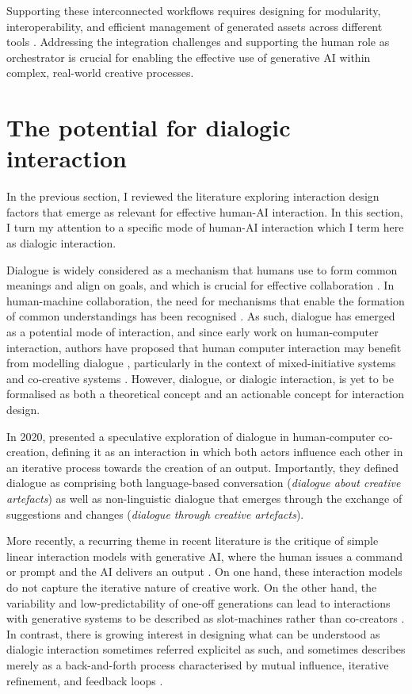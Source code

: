 Supporting these interconnected workflows requires designing for modularity, interoperability, and efficient management of generated assets across different tools \cite{Huang2020-fh, Palani2024-on}. Addressing the integration challenges and supporting the human role as orchestrator is crucial for enabling the effective use of generative AI within complex, real-world creative processes.

\section{The potential for dialogic interaction}

In the previous section, I reviewed the literature exploring interaction design factors that emerge as relevant for effective human-AI interaction. In this section, I turn my attention to a specific mode of human-AI interaction which I term here as dialogic interaction.

Dialogue is widely considered as a mechanism that humans use to form common meanings and align on goals, and which is crucial for effective collaboration \cite{Bohm1996-fo}. In human-machine collaboration, the need for mechanisms that enable the formation of common understandings has been recognised \cite{Dafoe2021-in}. As such, dialogue has emerged as a potential mode of interaction, and since early work on human-computer interaction, authors have proposed that human computer interaction may benefit from modelling dialogue \cite{Hayes1983-ca}, particularly in the context of mixed-initiative systems and co-creative systems \cite{Allen1999-sr, Yannakakis2014-zs, Deterding2017-wh}. However, dialogue, or dialogic interaction, is yet to be formalised as both a theoretical concept and an actionable concept for interaction design. 

In 2020, \cite{Bown2020-oc} presented a speculative exploration of dialogue in human-computer co-creation, defining it as an interaction in which both actors influence each other in an iterative process towards the creation of an output. Importantly, they defined dialogue as comprising both language-based conversation (\textit{dialogue about creative artefacts}) as well as non-linguistic dialogue that emerges through the exchange of suggestions and changes (\textit{dialogue through creative artefacts}).

More recently, a recurring theme in recent literature is the critique of simple linear interaction models with generative AI, where the human issues a command or prompt and the AI delivers an output \cite{Zhou2024-vp, Lin2023-jd, Tholander2023-rv}. On one hand, these interaction models do not capture the iterative nature of creative work. On the other hand, the variability and low-predictability of one-off generations can lead to interactions with generative systems to be described as slot-machines rather than co-creators \cite{Dylan2023-ma}. In contrast, there is growing interest in designing what can be understood as dialogic interaction sometimes referred explicitel as such, and sometimes describes merely as a back-and-forth process characterised by mutual influence, iterative refinement, and feedback loops \cite{Bown2020-oc, Gomez2023-bp, Wang2021-uy, Zhou2024-vp, Ghajargar2022-af, Feldman2017-ip}.

